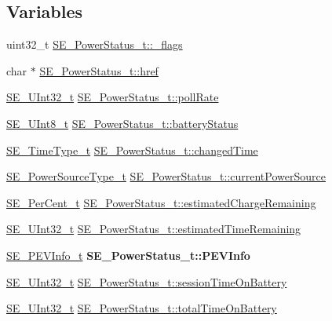 \subsection*{Variables}
\begin{DoxyCompactItemize}
\item 
uint32\+\_\+t \hyperlink{group__PowerStatus_ga89efe1b7a819073171911ffd6befa30a}{S\+E\+\_\+\+Power\+Status\+\_\+t\+::\+\_\+flags}
\item 
char $\ast$ \hyperlink{group__PowerStatus_gab2376abd124d3ae0ee8713cc53492976}{S\+E\+\_\+\+Power\+Status\+\_\+t\+::href}
\item 
\hyperlink{group__UInt32_ga70bd4ecda3c0c85d20779d685a270cdb}{S\+E\+\_\+\+U\+Int32\+\_\+t} \hyperlink{group__PowerStatus_gaaf69ae89597ebb0d2ea0a5c7d47b404c}{S\+E\+\_\+\+Power\+Status\+\_\+t\+::poll\+Rate}
\item 
\hyperlink{group__UInt8_gaf7c365a1acfe204e3a67c16ed44572f5}{S\+E\+\_\+\+U\+Int8\+\_\+t} \hyperlink{group__PowerStatus_ga76bdf536a5aa3eea3495b9a8ca737494}{S\+E\+\_\+\+Power\+Status\+\_\+t\+::battery\+Status}
\item 
\hyperlink{group__TimeType_ga6fba87a5b57829b4ff3f0e7638156682}{S\+E\+\_\+\+Time\+Type\+\_\+t} \hyperlink{group__PowerStatus_ga7fc041cacc1e4e6800ef1a1aeb11f3af}{S\+E\+\_\+\+Power\+Status\+\_\+t\+::changed\+Time}
\item 
\hyperlink{group__PowerSourceType_ga196e6e180c5421a97062704daa6a96fc}{S\+E\+\_\+\+Power\+Source\+Type\+\_\+t} \hyperlink{group__PowerStatus_gaa8e2324c602131abdb43ccb1aaa88405}{S\+E\+\_\+\+Power\+Status\+\_\+t\+::current\+Power\+Source}
\item 
\hyperlink{group__PerCent_ga14278cbee754c63496035b722b417ddc}{S\+E\+\_\+\+Per\+Cent\+\_\+t} \hyperlink{group__PowerStatus_ga32bbe2a8b8b9342158f91cf06b568004}{S\+E\+\_\+\+Power\+Status\+\_\+t\+::estimated\+Charge\+Remaining}
\item 
\hyperlink{group__UInt32_ga70bd4ecda3c0c85d20779d685a270cdb}{S\+E\+\_\+\+U\+Int32\+\_\+t} \hyperlink{group__PowerStatus_ga9220ab0a91c90bbbab34cca19884ad81}{S\+E\+\_\+\+Power\+Status\+\_\+t\+::estimated\+Time\+Remaining}
\item 
\mbox{\label{group__PowerStatus_gaf5f2def877b41d06d76f32710305d258}} 
\hyperlink{structSE__PEVInfo__t}{S\+E\+\_\+\+P\+E\+V\+Info\+\_\+t} {\bfseries S\+E\+\_\+\+Power\+Status\+\_\+t\+::\+P\+E\+V\+Info}
\item 
\hyperlink{group__UInt32_ga70bd4ecda3c0c85d20779d685a270cdb}{S\+E\+\_\+\+U\+Int32\+\_\+t} \hyperlink{group__PowerStatus_gac193c010e747194a855b7e0b266c3710}{S\+E\+\_\+\+Power\+Status\+\_\+t\+::session\+Time\+On\+Battery}
\item 
\hyperlink{group__UInt32_ga70bd4ecda3c0c85d20779d685a270cdb}{S\+E\+\_\+\+U\+Int32\+\_\+t} \hyperlink{group__PowerStatus_ga06d7be370852bb6cf390fbcc0097a239}{S\+E\+\_\+\+Power\+Status\+\_\+t\+::total\+Time\+On\+Battery}
\end{DoxyCompactItemize}


